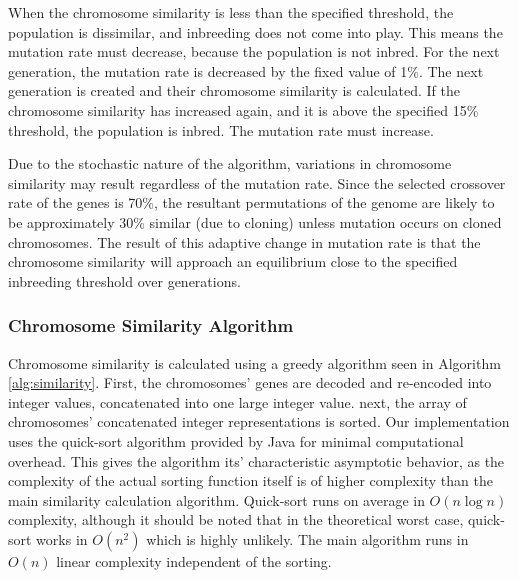 \documentclass{sig-alternate}
\begin{document}
When the chromosome similarity is less than the specified threshold, the population is dissimilar, and inbreeding does not come into play. This means the mutation rate must decrease, because the population is not inbred. For the next generation, the mutation rate is decreased by the fixed value of 1\%. The next generation is created and their chromosome similarity is calculated. If the chromosome similarity has increased again, and it is above the specified 15\% threshold, the population is inbred. The mutation rate must increase. 

Due to the stochastic nature of the algorithm, variations in chromosome similarity may result regardless of the mutation rate. Since the selected crossover rate of the genes is 70\%, the resultant permutations of the genome are likely to be approximately 30\% similar (due to cloning) unless mutation occurs on cloned chromosomes. The result of this adaptive change in mutation rate is that the chromosome similarity will approach an equilibrium close to the specified inbreeding threshold over generations.

\subsubsection{Chromosome Similarity Algorithm}
Chromosome similarity is calculated using a greedy algorithm seen in Algorithm \ref{alg:similarity}. First, the chromosomes' genes are decoded and re-encoded into integer values, concatenated into one large integer value. next, the array of chromosomes' concatenated integer representations is sorted. Our implementation uses the quick-sort algorithm provided by Java for minimal computational overhead. This gives the algorithm its' characteristic asymptotic behavior, as the complexity of the actual sorting function itself is of higher complexity than the main similarity calculation algorithm. Quick-sort runs on average in $O(n \log n)$ complexity, although it should be noted that in the theoretical worst case, quick-sort works in $O(n^2)$ which is highly unlikely. The main algorithm runs in $O(n)$ linear complexity independent of the sorting.
\end{document}
